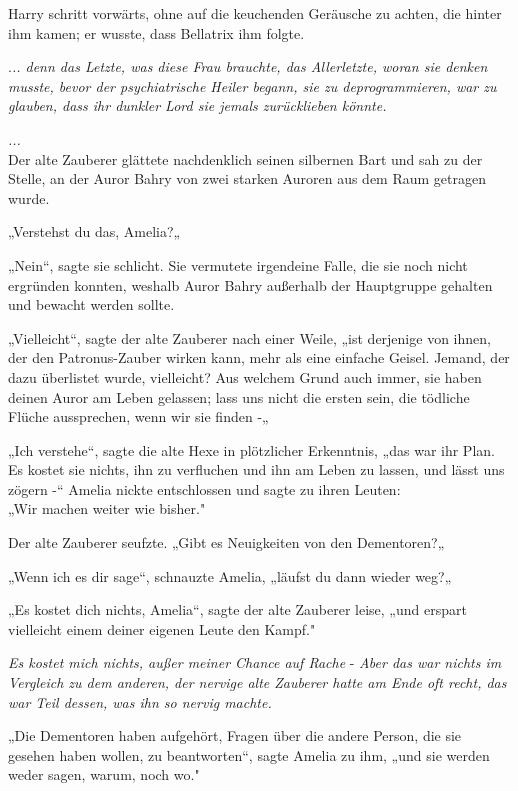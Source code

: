 {Harry schritt vorwärts, ohne auf die keuchenden Geräusche zu achten, die hinter ihm kamen; er wusste, dass Bellatrix ihm folgte.

.\emph{.. denn das Letzte, was diese Frau brauchte, das Allerletzte, woran sie denken musste, bevor der psychiatrische Heiler begann, sie zu deprogrammieren, war zu glauben, dass ihr dunkler Lord sie jemals zurücklieben könnte.}

\hfill\break \emph{...}\\ Der alte Zauberer glättete nachdenklich seinen silbernen Bart und sah zu der Stelle, an der Auror Bahry von zwei starken Auroren aus dem Raum getragen wurde.

„Verstehst du das, Amelia?„

„Nein“, sagte sie schlicht. Sie vermutete irgendeine Falle, die sie noch nicht ergründen konnten, weshalb Auror Bahry außerhalb der Hauptgruppe gehalten und bewacht werden sollte.

„Vielleicht“, sagte der alte Zauberer nach einer Weile, „ist derjenige von ihnen, der den Patronus-Zauber wirken kann, mehr als eine einfache Geisel. Jemand, der dazu überlistet wurde, vielleicht? Aus welchem Grund auch immer, sie haben deinen Auror am Leben gelassen; lass uns nicht die ersten sein, die tödliche Flüche aussprechen, wenn wir sie finden -„

„Ich verstehe“, sagte die alte Hexe in plötzlicher Erkenntnis, „das war ihr Plan.\\ Es kostet sie nichts, ihn zu verfluchen und ihn am Leben zu lassen, und lässt uns zögern -“ Amelia nickte entschlossen und sagte zu ihren Leuten:\\ „Wir machen weiter wie bisher."

Der alte Zauberer seufzte. „Gibt es Neuigkeiten von den Dementoren?„

„Wenn ich es dir sage“, schnauzte Amelia, „läufst du dann wieder weg?„

„Es kostet dich nichts, Amelia“, sagte der alte Zauberer leise, „und erspart vielleicht einem deiner eigenen Leute den Kampf."

\emph{Es kostet mich nichts, außer meiner Chance auf Rache} - \emph{Aber das war nichts im Vergleich zu dem anderen, der nervige alte Zauberer hatte am Ende oft recht, das war Teil dessen, was ihn so nervig machte.}

„Die Dementoren haben aufgehört, Fragen über die andere Person, die sie gesehen haben wollen, zu beantworten“, sagte Amelia zu ihm, „und sie werden weder sagen, warum, noch wo."

}
